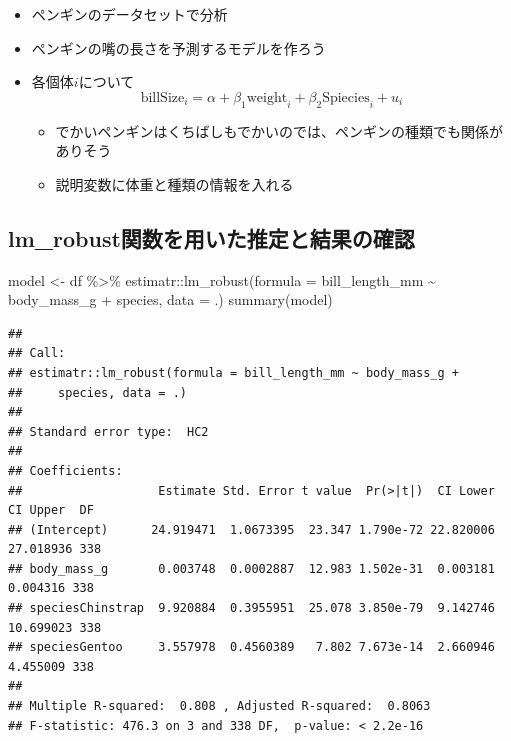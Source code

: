\documentclass[
]{ltjsarticle}
\newenvironment{Shaded}{\begin{snugshade}}{\end{snugshade}}
\newcommand{\AttributeTok}[1]{\textcolor[rgb]{0.77,0.63,0.00}{#1}}
\newcommand{\FunctionTok}[1]{\textcolor[rgb]{0.00,0.00,0.00}{#1}}
\newcommand{\NormalTok}[1]{#1}
\newcommand{\OtherTok}[1]{\textcolor[rgb]{0.56,0.35,0.01}{#1}}
\newcommand{\SpecialCharTok}[1]{\textcolor[rgb]{0.00,0.00,0.00}{#1}}
\providecommand{\tightlist}{%
  \setlength{\itemsep}{0pt}\setlength{\parskip}{0pt}}
\begin{document}
\begin{itemize}
\tightlist
\item
  ペンギンのデータセットで分析
\item
  ペンギンの嘴の長さを予測するモデルを作ろう
\item
  各個体\(i\)について
  \[\text{billSize}_{i} = \alpha + \beta_1\text{weight}_i + \beta_2 \text{Spiecies}_i + u_i\]

  \begin{itemize}
  \tightlist
  \item
    でかいペンギンはくちばしもでかいのでは、ペンギンの種類でも関係がありそう
  \item
    説明変数に体重と種類の情報を入れる
  \end{itemize}
\end{itemize}

\hypertarget{lm_robustux95a2ux6570ux3092ux7528ux3044ux305fux63a8ux5b9aux3068ux7d50ux679cux306eux78baux8a8d}{%
\subsection{lm\_robust関数を用いた推定と結果の確認}\label{lm_robustux95a2ux6570ux3092ux7528ux3044ux305fux63a8ux5b9aux3068ux7d50ux679cux306eux78baux8a8d}}

\begin{Shaded}
\begin{Highlighting}[]
\NormalTok{model }\OtherTok{\textless{}{-}}\NormalTok{ df }\SpecialCharTok{\%\textgreater{}\%}
\NormalTok{  estimatr}\SpecialCharTok{::}\FunctionTok{lm\_robust}\NormalTok{(}\AttributeTok{formula =}\NormalTok{ bill\_length\_mm }\SpecialCharTok{\textasciitilde{}}\NormalTok{ body\_mass\_g }\SpecialCharTok{+}\NormalTok{ species, }\AttributeTok{data =}\NormalTok{ .)}
\FunctionTok{summary}\NormalTok{(model)}
\end{Highlighting}
\end{Shaded}

\begin{verbatim}
## 
## Call:
## estimatr::lm_robust(formula = bill_length_mm ~ body_mass_g + 
##     species, data = .)
## 
## Standard error type:  HC2 
## 
## Coefficients:
##                   Estimate Std. Error t value  Pr(>|t|)  CI Lower  CI Upper  DF
## (Intercept)      24.919471  1.0673395  23.347 1.790e-72 22.820006 27.018936 338
## body_mass_g       0.003748  0.0002887  12.983 1.502e-31  0.003181  0.004316 338
## speciesChinstrap  9.920884  0.3955951  25.078 3.850e-79  9.142746 10.699023 338
## speciesGentoo     3.557978  0.4560389   7.802 7.673e-14  2.660946  4.455009 338
## 
## Multiple R-squared:  0.808 , Adjusted R-squared:  0.8063 
## F-statistic: 476.3 on 3 and 338 DF,  p-value: < 2.2e-16
\end{verbatim}
\end{document}
